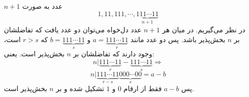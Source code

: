 \p
$n+1$
عدد به صورت
$$1, 11, 111, \cdots, \underbrace{111\cdots11}_{n+1}$$
در نظر می‌گیریم. در میان هر
$n+1$
عدد دل‌خواه می‌توان دو عدد یافت که تفاضلشان بر
$n$
بخش‌پذیر باشد. پس دو عدد مانند
$a = \underbrace{111\cdots11}_{r}$
و
$b = \underbrace{111\cdots11}_{s}$
که
$r > s$
است، وجود دارند که تفاضلشان بر
$n$
بخش‌پذیر است. یعنی:
$$n | \underbrace{111\cdots11}_{r} - \underbrace{111\cdots11}_{s} \Rightarrow$$
$$n | \underbrace{111\cdots11}_{r-s}\underbrace{000\cdots00}_{s} = a - b$$
پس
$a - b$
فقط از ارقام
$0$
و
$1$
تشکیل شده و بر
$n$
بخش‌پذیر است.